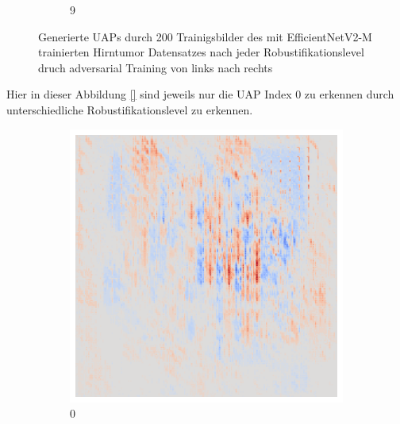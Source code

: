 \begin{figure}[ht!]
\begin{subfigure}{0.095\linewidth}
        \caption{9}
    \end{subfigure}
    \caption{Generierte UAPs durch 200 Trainigsbilder des mit EfficientNetV2-M trainierten Hirntumor Datensatzes nach jeder Robustifikationslevel druch adversarial Training von links nach rechts}
    \label{fig:uap-resnet18-covidx-rob0}
\end{figure}

Hier in dieser Abbildung \ref{} sind jeweils nur die UAP Index 0 zu erkennen durch unterschiedliche Robustifikationslevel zu erkennen. 


\begin{figure}[ht!]
    \centering
    \begin{subfigure}{0.095\linewidth}
        \centering
        \includegraphics[height=1\linewidth]{01-images/05-resultate/uap_efficientnet/uap0-efficientnetv2m-mri-n200-robustificationslevel0.png}
        \caption{0}
    \end{subfigure}\hfill%
    \begin{subfigure}{0.095\linewidth}
        \centering

\end{subfigure}
\end{figure}
